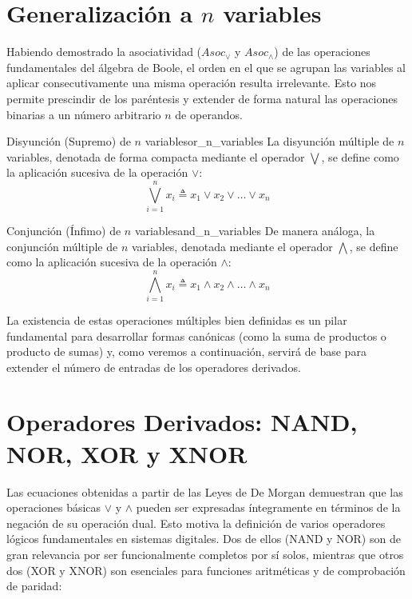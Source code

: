 \documentclass[12pt,a4paper]{article}
\begin{document}
\section{Generalización a $n$ variables}

Habiendo demostrado la asociatividad ($Asoc_\vee$ y $Asoc_\wedge$) de las operaciones fundamentales del álgebra de Boole, el orden en el que se agrupan las variables al aplicar consecutivamente una misma operación resulta irrelevante. Esto nos permite prescindir de los paréntesis y extender de forma natural las operaciones binarias a un número arbitrario $n$ de operandos.

\begin{definicion}{Disyunción (Supremo) de $n$ variables}{or_n_variables}
La disyunción múltiple de $n$ variables, denotada de forma compacta mediante el operador $\bigvee$, se define como la aplicación sucesiva de la operación $\vee$:
\[ \bigvee_{i=1}^n x_i \triangleq x_1 \vee x_2 \vee \dots \vee x_n \]
\end{definicion}

\begin{definicion}{Conjunción (Ínfimo) de $n$ variables}{and_n_variables}
De manera análoga, la conjunción múltiple de $n$ variables, denotada mediante el operador $\bigwedge$, se define como la aplicación sucesiva de la operación $\wedge$:
\[ \bigwedge_{i=1}^n x_i \triangleq x_1 \wedge x_2 \wedge \dots \wedge x_n \]
\end{definicion}

La existencia de estas operaciones múltiples bien definidas es un pilar fundamental para desarrollar formas canónicas (como la suma de productos o producto de sumas) y, como veremos a continuación, servirá de base para extender el número de entradas de los operadores derivados.


\section{Operadores Derivados: NAND, NOR, XOR y XNOR}
Las ecuaciones obtenidas a partir de las Leyes de De Morgan demuestran que las operaciones básicas $\vee$ y $\wedge$ pueden ser expresadas íntegramente en términos de la negación de su operación dual. Esto motiva la definición de varios operadores lógicos fundamentales en sistemas digitales. Dos de ellos (NAND y NOR) son de gran relevancia por ser funcionalmente completos por sí solos, mientras que otros dos (XOR y XNOR) son esenciales para funciones aritméticas y de comprobación de paridad:
\end{document}
